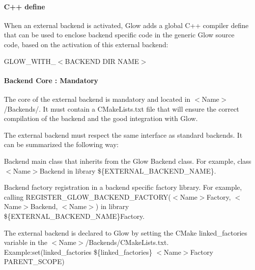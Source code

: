 \paragraph*{C++ define}

When an external backend is activated, Glow adds a global C++ compiler define that can be used to enclose backend specific code in the generic Glow source code, based on the activation of this external backend\+:


\begin{DoxyItemize}
\item {\ttfamily G\+L\+O\+W\+\_\+\+W\+I\+T\+H\+\_\+$<$B\+A\+C\+K\+E\+ND D\+IR N\+A\+ME$>$}
\end{DoxyItemize}

\paragraph*{Backend Core \+: Mandatory}

The core of the external backend is mandatory and located in {\ttfamily $<$Name$>$/\+Backends/}. It must contain a {\ttfamily C\+Make\+Lists.\+txt} file that will ensure the correct compilation of the backend and the good integration with Glow.

The external backend must respect the same interface as standard backends. It can be summarized the following way\+:


\begin{DoxyItemize}
\item Backend main class that inherits from the Glow {\ttfamily Backend} class. For example, class {\ttfamily $<$Name$>$Backend} in library {\ttfamily \$\{E\+X\+T\+E\+R\+N\+A\+L\+\_\+\+B\+A\+C\+K\+E\+N\+D\+\_\+\+N\+A\+ME\}}.
\item Backend factory registration in a backend specific factory library. For example, calling {\ttfamily R\+E\+G\+I\+S\+T\+E\+R\+\_\+\+G\+L\+O\+W\+\_\+\+B\+A\+C\+K\+E\+N\+D\+\_\+\+F\+A\+C\+T\+O\+RY($<$Name$>$Factory, $<$Name$>$Backend, $<$Name$>$)} in library {\ttfamily \$\{E\+X\+T\+E\+R\+N\+A\+L\+\_\+\+B\+A\+C\+K\+E\+N\+D\+\_\+\+N\+A\+ME\}Factory}.
\end{DoxyItemize}

The external backend is declared to Glow by setting the C\+Make {\ttfamily linked\+\_\+factories} variable in the {\ttfamily $<$Name$>$/\+Backends/\+C\+Make\+Lists.txt}. Example\+:{\ttfamily set(linked\+\_\+factories \$\{linked\+\_\+factories\} $<$Name$>$Factory P\+A\+R\+E\+N\+T\+\_\+\+S\+C\+O\+PE)}

